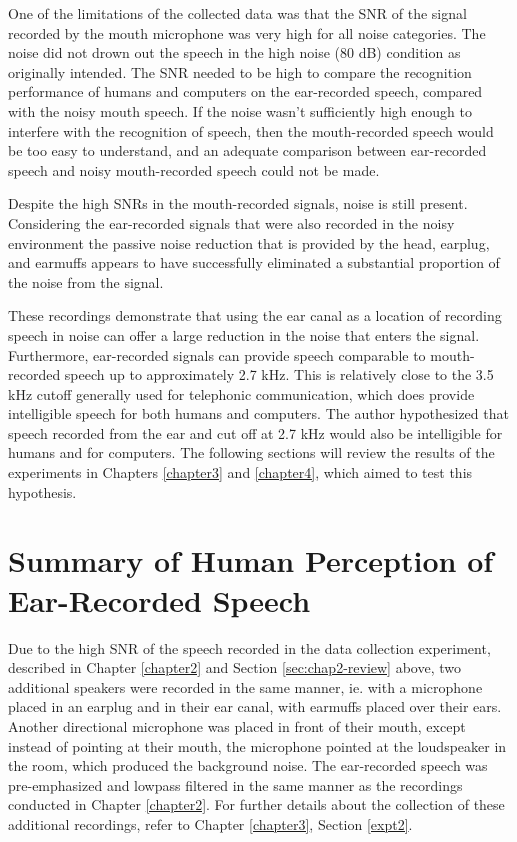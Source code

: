 One of the limitations of the collected data was that the SNR of the signal recorded by the mouth microphone was very high for all noise categories.  The noise did not drown out the speech in the high noise (80 dB) condition as originally intended.  The SNR needed to be high to compare the recognition performance of humans and computers on the ear-recorded speech, compared with the noisy mouth speech.  If the noise wasn't sufficiently high enough to interfere with the recognition of speech, then the mouth-recorded speech would be too easy to understand, and an adequate comparison between ear-recorded speech and noisy mouth-recorded speech could not be made.

Despite the high SNRs in the mouth-recorded signals, noise is still present.  Considering the ear-recorded signals that were also recorded in the noisy environment %
the passive noise reduction that is provided by the head, earplug, and earmuffs appears to have successfully eliminated a substantial proportion of the noise from the signal.

These recordings demonstrate that using the ear canal as a location of recording speech in noise can offer a large reduction in the noise that enters the signal.  Furthermore, ear-recorded signals can provide speech comparable to mouth-recorded speech up to approximately 2.7 kHz.  This is relatively close to the 3.5 kHz cutoff generally used for telephonic communication, which does provide intelligible speech for both humans and computers. The author hypothesized that speech recorded from the ear and cut off at 2.7 kHz would also be intelligible for humans and for computers.  The following sections will review the results of the experiments in Chapters \ref{chapter3} and \ref{chapter4}, which aimed to test this hypothesis.


\section{Summary of Human Perception of Ear-Recorded Speech}\label{sec:chap3-review}

Due to the high SNR of the speech recorded in the data collection experiment, described in Chapter \ref{chapter2} and Section \ref{sec:chap2-review} above, two additional speakers were recorded in the same manner, ie. with a microphone placed in an earplug and in their ear canal, with earmuffs placed over their ears.  Another directional microphone was placed in front of their mouth, except instead of pointing at their mouth, the microphone pointed at the loudspeaker in the room, which produced the background noise. The ear-recorded speech was pre-emphasized and lowpass filtered in the same manner as the recordings conducted in Chapter \ref{chapter2}. For further details about the collection of these additional recordings, refer to Chapter \ref{chapter3}, Section \ref{expt2}.

